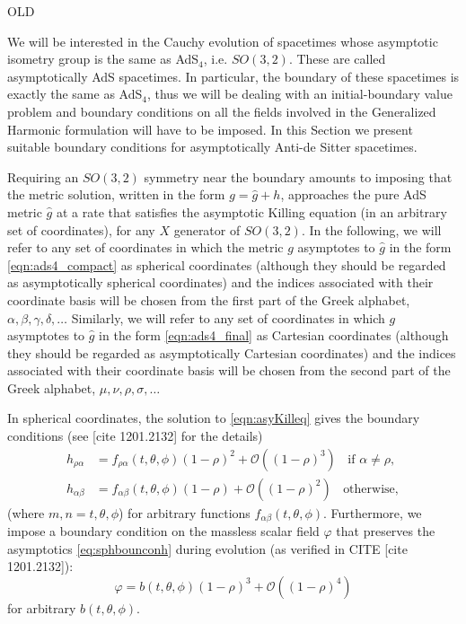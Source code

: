 \documentclass[a4paper,11pt]{article}
\begin{document}
\iffalse
OLD

We will be interested in the Cauchy evolution of spacetimes whose asymptotic isometry group is the same as AdS$_4$, i.e. $SO(3,2)$. These are called asymptotically AdS spacetimes. In particular, the boundary of these spacetimes is exactly the same as AdS$_4$, thus we will be dealing with an initial-boundary value problem and boundary conditions on all the fields involved in the Generalized Harmonic formulation will have to be imposed.
In this Section we present suitable boundary conditions for asymptotically Anti-de Sitter spacetimes.

Requiring an $SO(3,2)$ symmetry near the boundary amounts to imposing that the metric solution, written in the form $g=\hat{g}+h$, approaches the pure AdS metric $\hat{g}$ at a rate that satisfies the asymptotic Killing equation (in an arbitrary set of coordinates), 
for any $X$ generator of $SO(3,2)$. 
In the following, we will refer to any set of coordinates in which the metric $g$ asymptotes to $\hat{g}$ in the form \eqref{eqn:ads4_compact} as spherical coordinates (although they should be regarded as asymptotically spherical coordinates) and the indices associated with their coordinate basis will be chosen from the first part of the Greek alphabet, $\alpha,\beta,\gamma,\delta,\dots$
Similarly, we will refer to any set of coordinates in which $g$ asymptotes to $\hat{g}$ in the form \eqref{eqn:ads4_final} as Cartesian coordinates (although they should be regarded as asymptotically Cartesian coordinates) and the indices associated with their coordinate basis will be chosen from the second part of the Greek alphabet, $\mu,\nu,\rho,\sigma,\dots$

In spherical coordinates, the solution to \eqref{eqn:asyKilleq} gives the boundary conditions (see [cite 1201.2132] for the details)
\begin{eqnarray}
\label{eq:sphbounconh}
h_{\rho\alpha}&=f_{\rho\alpha}(t,\theta,\phi)(1-\rho)^2+\mathcal{O}((1-\rho)^3) \;\; \textrm{ if $\alpha\neq\rho$}, \\ \nonumber
h_{\alpha\beta}&=f_{\alpha\beta}(t,\theta,\phi)(1-\rho)+\mathcal{O}((1-\rho)^{2}) \;\; \textrm{ otherwise},
\end{eqnarray}
(where $m,n=t,\theta,\phi$) for arbitrary functions $f_{\alpha\beta}(t,\theta,\phi)$. Furthermore, we impose a boundary condition on the massless scalar field $\varphi$ that preserves the asymptotics \eqref{eq:sphbounconh} during evolution (as verified in CITE [cite 1201.2132]):
\begin{equation}\label{eq:sphbounconphi}
\varphi=b(t,\theta,\phi)(1-\rho)^3+\mathcal{O}((1-\rho)^4)
\end{equation}
for arbitrary $b(t,\theta,\phi)$.
\end{document}
